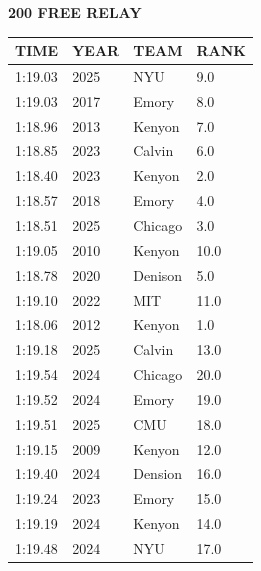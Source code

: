 \begin{table}[H]
\centering
\begin{minipage}[t]{0.6\textwidth}
\centering
\textbf{200 FREE RELAY}\\[0.1cm]
\begin{tabular}{@{}p{1.8cm}p{1.2cm}p{1.4cm}p{0.8cm}@{}}
\hline
    \textbf{TIME} & \textbf{YEAR} & \textbf{TEAM} & \textbf{RANK} \\
\hline
    1:19.03 & 2025 & NYU & 9.0 \\
    1:19.03 & 2017 & Emory & 8.0 \\
    1:18.96 & 2013 & Kenyon & 7.0 \\
    1:18.85 & 2023 & Calvin & 6.0 \\
    1:18.40 & 2023 & Kenyon & 2.0 \\
    1:18.57 & 2018 & Emory & 4.0 \\
    1:18.51 & 2025 & Chicago & 3.0 \\
    1:19.05 & 2010 & Kenyon & 10.0 \\
    1:18.78 & 2020 & Denison & 5.0 \\
    1:19.10 & 2022 & MIT & 11.0 \\
    1:18.06 & 2012 & Kenyon & 1.0 \\
    1:19.18 & 2025 & Calvin & 13.0 \\
    1:19.54 & 2024 & Chicago & 20.0 \\
    1:19.52 & 2024 & Emory & 19.0 \\
    1:19.51 & 2025 & CMU & 18.0 \\
    1:19.15 & 2009 & Kenyon & 12.0 \\
    1:19.40 & 2024 & Dension & 16.0 \\
    1:19.24 & 2023 & Emory & 15.0 \\
    1:19.19 & 2024 & Kenyon & 14.0 \\
    1:19.48 & 2024 & NYU & 17.0 \\
\hline
\end{tabular}
\end{minipage}
\end{table}

